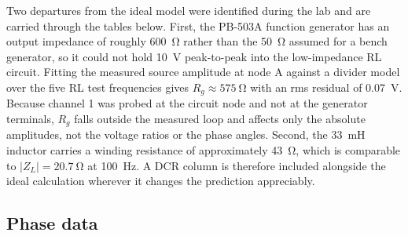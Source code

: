 \documentclass[11pt]{article}
\begin{document}
Two departures from the ideal model were identified during the lab and are
carried through the tables below. First, the PB-503A function generator has an
output impedance of roughly \SI{600}{\ohm} rather than the \SI{50}{\ohm} assumed
for a bench generator, so it could not hold \SI{10}{\volt} peak-to-peak into the
low-impedance RL circuit. Fitting the measured source amplitude at node A against
a divider model over the five RL test frequencies gives
$R_g \approx \SI{575}{\ohm}$ with an rms residual of \SI{0.07}{\volt}. Because
channel 1 was probed at the circuit node and not at the generator terminals,
$R_g$ falls outside the measured loop and affects only the absolute amplitudes,
not the voltage ratios or the phase angles. Second, the \SI{33}{\milli\henry}
inductor carries a winding resistance of approximately \SI{43}{\ohm}, which is
comparable to $|Z_L| = \SI{20.7}{\ohm}$ at \SI{100}{\hertz}. A DCR column is
therefore included alongside the ideal calculation wherever it changes the
prediction appreciably.

\subsection*{Phase data}
\end{document}
